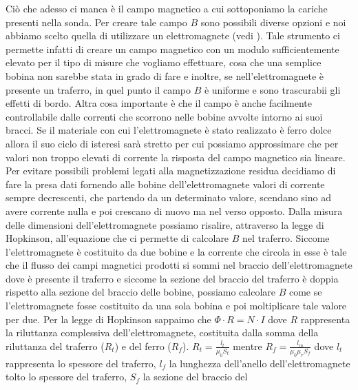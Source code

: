 \documentclass[
    prl,
    reprint, 
    superscriptaddress, 
    altaffilletter, 
    amsmath, 
    amssymb, 
    a4paper,
    varvw]{revtex4-2}
\begin{document}
Ciò che adesso ci manca è il campo magnetico a cui sottoponiamo la cariche presenti nella sonda. Per creare tale campo $B$ sono possibili diverse opzioni e noi abbiamo scelto quella di utilizzare un elettromagnete (vedi ). Tale strumento ci permette infatti di creare un campo magnetico con un modulo sufficientemente elevato per il tipo di misure che vogliamo effettuare, cosa che una semplice bobina non sarebbe stata in grado di fare e inoltre, se nell'elettromagnete è presente un traferro, in quel punto il campo $B$ è uniforme e sono trascurabii gli effetti di bordo. Altra cosa importante è che il campo è anche facilmente controllabile dalle correnti che scorrono nelle bobine avvolte intorno ai suoi bracci. Se il materiale con cui l'elettromagnete è stato realizzato è ferro dolce allora il suo ciclo di isteresi sarà stretto per cui possiamo approssimare che per valori non troppo elevati di corrente la risposta del campo magnetico sia lineare. Per evitare possibili problemi legati alla magnetizzazione residua decidiamo di fare la presa dati fornendo alle bobine dell'elettromagnete valori di corrente sempre decrescenti, che partendo da un determinato valore, scendano sino ad avere corrente nulla e poi crescano di nuovo ma nel verso opposto. 
Dalla misura delle dimensioni dell'elettromagnete possiamo risalire, attraverso la legge di Hopkinson, all'equazione che ci permette di calcolare $B$ nel traferro. Siccome l'elettromagnete è costituito da due bobine e la corrente che circola in esse è tale che il flusso dei campi magnetici prodotti si sommi nel braccio dell'elettromagnete dove è presente il traferro e siccome la sezione del braccio del traferro è doppia rispetto alla sezione del braccio delle bobine, possiamo calcolare $B$ come se l'elettromagnete fosse costituito da una sola bobina e poi moltiplicare tale valore per due. Per la legge di Hopkinson sappaimo che  $\Phi\cdot R=N\cdot I$ dove $R$ rappresenta la riluttanza complessiva dell'elettromagnete, costituita dalla somma della riluttanza del traferro ($R_{t}$) e del ferro ($R_{f}$).
$R_{t}=\frac{l_{t}}{\mu_{0}S_{t}}$ mentre $R_{f}=\frac{l_{m}}{\mu_{0}\mu_{r}S_{f}}$ dove $l_{t}$ rappresenta lo spessore del traferro, $l_{f}$ la lunghezza dell'anello dell'elettromagnete tolto lo spessore del traferro, $S_{f}$ la sezione del braccio del
\end{document}
